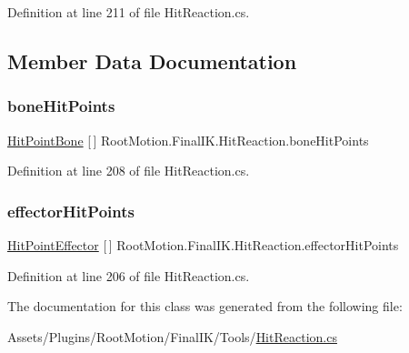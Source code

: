 Definition at line 211 of file Hit\+Reaction.\+cs.



\subsection{Member Data Documentation}
\mbox{\label{class_root_motion_1_1_final_i_k_1_1_hit_reaction_a9d7401d21f72ad8b4ae46a944288b94b}} 
\subsubsection{\texorpdfstring{bone\+Hit\+Points}{boneHitPoints}}
{\footnotesize\ttfamily \mbox{\hyperlink{class_root_motion_1_1_final_i_k_1_1_hit_reaction_1_1_hit_point_bone}{Hit\+Point\+Bone}} \mbox{[}$\,$\mbox{]} Root\+Motion.\+Final\+I\+K.\+Hit\+Reaction.\+bone\+Hit\+Points}



Definition at line 208 of file Hit\+Reaction.\+cs.

\mbox{\label{class_root_motion_1_1_final_i_k_1_1_hit_reaction_a0ab31dcf8855274470247dcbefa3eb61}} 
\subsubsection{\texorpdfstring{effector\+Hit\+Points}{effectorHitPoints}}
{\footnotesize\ttfamily \mbox{\hyperlink{class_root_motion_1_1_final_i_k_1_1_hit_reaction_1_1_hit_point_effector}{Hit\+Point\+Effector}} \mbox{[}$\,$\mbox{]} Root\+Motion.\+Final\+I\+K.\+Hit\+Reaction.\+effector\+Hit\+Points}



Definition at line 206 of file Hit\+Reaction.\+cs.



The documentation for this class was generated from the following file\+:\begin{DoxyCompactItemize}
\item 
Assets/\+Plugins/\+Root\+Motion/\+Final\+I\+K/\+Tools/\mbox{\hyperlink{_hit_reaction_8cs}{Hit\+Reaction.\+cs}}\end{DoxyCompactItemize}
